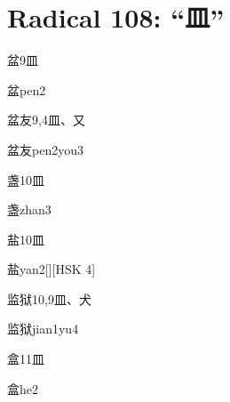 
\section*{Radical 108: ``⽫''}

\begin{entry}{盆}{9}{⽫}
  \begin{phonetics}{盆}{pen2}
  \end{phonetics}
\end{entry}

\begin{entry}{盆友}{9,4}{⽫、⼜}
  \begin{phonetics}{盆友}{pen2you3}
  \end{phonetics}
\end{entry}

\begin{entry}{盏}{10}{⽫}
  \begin{phonetics}{盏}{zhan3}
  \end{phonetics}
\end{entry}

\begin{entry}{盐}{10}{⽫}
  \begin{phonetics}{盐}{yan2}[][HSK 4]
  \end{phonetics}
\end{entry}

\begin{entry}{监狱}{10,9}{⽫、⽝}
  \begin{phonetics}{监狱}{jian1yu4}
  \end{phonetics}
\end{entry}

\begin{entry}{盒}{11}{⽫}
  \begin{phonetics}{盒}{he2}
  \end{phonetics}
\end{entry}

